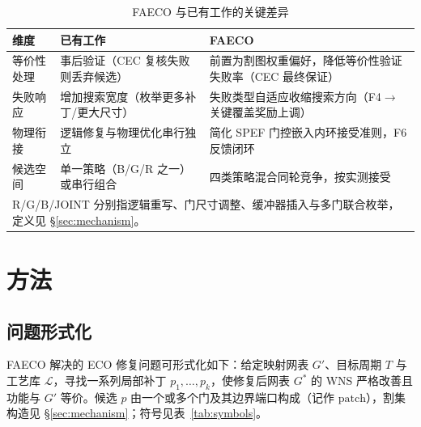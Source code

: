 \documentclass[journal]{IEEEtran}
\begin{document}
\begin{table}[!t]
\centering
\caption{FAECO 与已有工作的关键差异}
\label{tab:related_diff}
\footnotesize
\setlength{\tabcolsep}{3pt}
\begin{tabular}{p{2.2cm}p{2.8cm}p{3.2cm}}
\toprule
\textbf{维度} & \textbf{已有工作} & \textbf{FAECO} \\
\midrule
等价性处理 & 事后验证（CEC 复核失败则丢弃候选） & 前置为割图权重偏好，降低等价性验证失败率（CEC 最终保证） \\
失败响应 & 增加搜索宽度（枚举更多补丁/更大尺寸） & 失败类型自适应收缩搜索方向（F4$\to$关键覆盖奖励上调） \\
物理衔接 & 逻辑修复与物理优化串行独立 & 简化 SPEF 门控嵌入内环接受准则，F6 反馈闭环 \\
候选空间 & 单一策略（B/G/R 之一）或串行组合 & 四类策略混合同轮竞争，按实测接受 \\
\bottomrule
\multicolumn{3}{p{8.0cm}}{\footnotesize R/G/B/JOINT 分别指逻辑重写、门尺寸调整、缓冲器插入与多门联合枚举，定义见 \S\ref{sec:mechanism}。}\\
\end{tabular}
\end{table}

\section{方法}

\subsection{问题形式化}
FAECO 解决的 ECO 修复问题可形式化如下：给定映射网表 $G'$、目标周期 $T$ 与工艺库 $\mathcal{L}$，寻找一系列局部补丁 $p_1,\dots,p_k$，使修复后网表 $G^*$ 的 WNS 严格改善且功能与 $G'$ 等价。候选 $p$ 由一个或多个门及其边界端口构成（记作 $\mathrm{patch}$），割集构造见 \S\ref{sec:mechanism}；符号见表~\ref{tab:symbols}。
\end{document}
